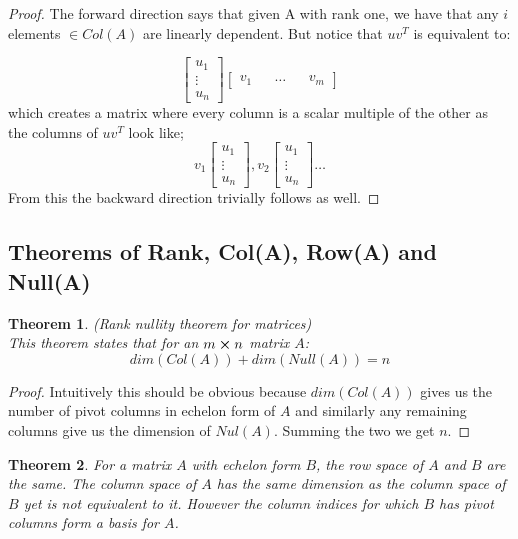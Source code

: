 \documentclass[titlepage]{article}
\newtheorem{thm}{Theorem}[subsection]
\numberwithin{equation}{subsection}
\begin{document}
\begin{proof}
The forward direction says that given A with rank one, we have that any $i$ elements $\in Col(A)$ are linearly dependent. But notice that $uv^{T}$ is equivalent to:

$$ \begin{bmatrix}
    u_{1}\\
    \vdots\\
    u_{n}
\end{bmatrix} \begin{bmatrix}
    v_{1} && \hdots && v_{m}
\end{bmatrix}$$ which creates a matrix where every column is a scalar multiple of the other as the columns of $uv^{T}$ look like;
$$ v_{1}\begin{bmatrix}
    u_{1}\\
    \vdots\\
    u_{n}
\end{bmatrix},v_{2}\begin{bmatrix}
    u_{1}\\
    \vdots\\
    u_{n}
\end{bmatrix} \hdots$$
From this the backward direction trivially follows as well. 
\end{proof}

\subsection{Theorems of Rank, Col(A), Row(A) and Null(A)} 

\begin{tcolorbox}
\begin{thm}(Rank nullity theorem for matrices)
\\
This theorem states that for an $m\cross n$ matrix $A$:
$$ dim(Col(A)) + dim(Null(A)) = n$$
\end{thm}

\begin{proof}
Intuitively this should be obvious because $dim(Col(A))$ gives us the number of pivot columns in echelon form of $A$ and similarly any remaining columns give us the dimension of $Nul(A)$. Summing the two we get $n$. 
\end{proof}

\begin{thm} For a matrix $A$ with echelon form $B$, the row space of $A$ and $B$ are the same. The column space of $A$ has the same dimension as the column space of $B$ yet is not equivalent to it. However the column indices for which $B$ has pivot columns form a basis for $A$. 
\end{thm}
\end{tcolorbox}
\end{document}
